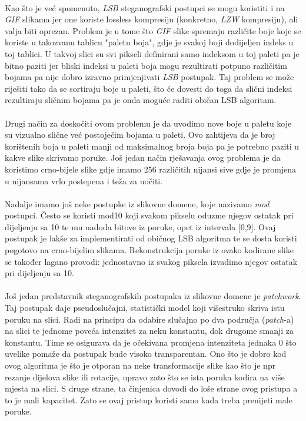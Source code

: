 \documentclass[times, utf8, seminar]{fer}
\begin{document}
\paragraph{}
Kao što je već spomenuto, \textit{LSB} steganografski postupci se mogu koristiti i na \textit{GIF} slikama jer one koriste lossless kompresiju (konkretno, \textit{LZW} kompresiju), ali valja biti oprezan. Problem je u tome što \textit{GIF} slike spremaju različite boje koje se koriste u takozvanu tablicu "paletu boja", gdje je svakoj boji dodijeljen indeks u toj tablici. U takvoj slici su svi pikseli definirani samo indeksom u toj paleti pa je bitno paziti jer bliski indeksi u paleti boja mogu rezultirati potpuno različitim bojama pa nije dobro izravno primjenjivati \textit{LSB} postupak. Taj problem se može riješiti tako da se sortiraju boje u paleti, što će dovesti do toga da slični indeksi rezultiraju sličnim bojama pa je onda moguće raditi običan LSB algoritam.
\paragraph{}
Drugi način za doskočiti ovom problemu je da uvodimo nove boje u paletu koje su vizualno slične već postojećim bojama u paleti. Ovo zahtijeva da je broj korištenih boja u paleti manji od maksimalnog broja boja pa je potrebno paziti u kakve slike skrivamo poruke. Još jedan način rješavanja ovog problema je da koristimo crno-bijele slike gdje imamo 256 različitih nijansi sive gdje je promjena u nijansama vrlo postepena i teža za uočiti.
\paragraph{}
Nadalje imamo još neke postupke iz slikovne domene, koje nazivamo \textit{mod} postupci. Često se koristi mod10 koji svakom pikselu oduzme njegov ostatak pri dijeljenju sa 10 te mu nadoda bitove iz poruke, opet iz intervala [0,9]. Ovaj postupak je lakše za implementirati od običnog LSB algoritma te se dosta koristi pogotovo na crno-bijelim slikama. Rekonstrukcija poruke iz ovako kodirane slike se također lagano provodi: jednostavno iz svakog piksela izvadimo njegov ostatak pri dijeljenju sa 10.
\paragraph{}
Još jedan predstavnik steganografskih postupaka iz slikovne domene je \textit{patchwork}. Taj postupak daje pseudoslučajni, statistički model koji višestruko skriva istu poruku na slici. Radi na principu da odabire slučajno po dva područja (\textit{patch}-a) na slici te jednome poveća intenzitet za neku konstantu, dok drugome smanji za konstantu. Time se osigurava da je očekivana promjena intenziteta jednaka 0 što uvelike pomaže da postupak bude visoko transparentan. Ono što je dobro kod ovog algoritma je što je otporan na neke transformacije slike kao što je npr rezanje dijelova slike ili rotacije, upravo zato što se ista poruka kodira na više mjesta na slici. S druge strane, ta činjenica dovodi do loše strane ovog pristupa a to je mali kapacitet. Zato se ovaj pristup koristi samo kada treba prenijeti male poruke.
\end{document}
